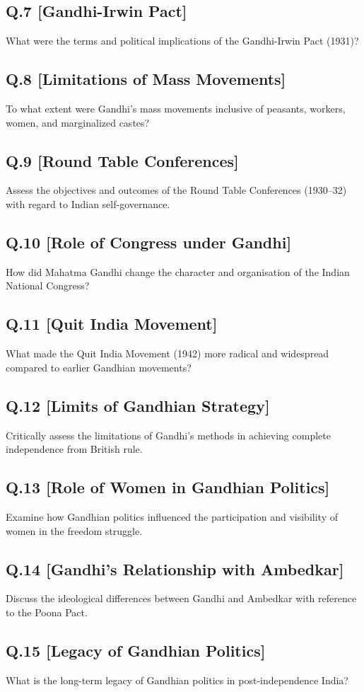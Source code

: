 \subsection*{Q.7 [Gandhi-Irwin Pact]}
What were the terms and political implications of the Gandhi-Irwin Pact (1931)?

\subsection*{Q.8 [Limitations of Mass Movements]}
To what extent were Gandhi's mass movements inclusive of peasants, workers, women, and marginalized castes?

\subsection*{Q.9 [Round Table Conferences]}
Assess the objectives and outcomes of the Round Table Conferences (1930–32) with regard to Indian self-governance.

\subsection*{Q.10 [Role of Congress under Gandhi]}
How did Mahatma Gandhi change the character and organisation of the Indian National Congress?

\subsection*{Q.11 [Quit India Movement]}
What made the Quit India Movement (1942) more radical and widespread compared to earlier Gandhian movements?

\subsection*{Q.12 [Limits of Gandhian Strategy]}
Critically assess the limitations of Gandhi’s methods in achieving complete independence from British rule.

\subsection*{Q.13 [Role of Women in Gandhian Politics]}
Examine how Gandhian politics influenced the participation and visibility of women in the freedom struggle.

\subsection*{Q.14 [Gandhi’s Relationship with Ambedkar]}
Discuss the ideological differences between Gandhi and Ambedkar with reference to the Poona Pact.

\subsection*{Q.15 [Legacy of Gandhian Politics]}
What is the long-term legacy of Gandhian politics in post-independence India?


